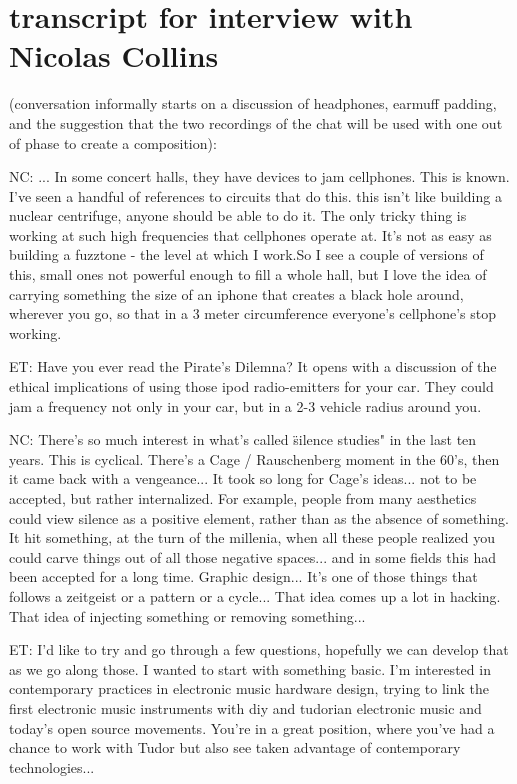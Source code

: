 \section{transcript for interview with Nicolas Collins}

(conversation informally starts on a discussion of headphones, earmuff padding, and the suggestion that the two recordings of the chat will be used with one out of phase to create a composition): 

NC: ... In some concert halls, they have devices to jam cellphones. This is known. I've seen a handful of references to circuits that do this. this isn't like building a nuclear centrifuge, anyone should be able to do it. The only tricky thing is working at such high frequencies that cellphones operate at. It's not as easy as building a fuzztone - the level at which I work.So I see a couple of versions of this, small ones not powerful enough to fill a whole hall, but I love the idea of carrying something the size of an iphone that creates a black hole around, wherever you go, so that in a 3 meter circumference everyone's cellphone's stop working. 

ET: Have you ever read the Pirate's Dilemna? It opens with a discussion of the ethical implications of using those ipod radio-emitters for your car. They could jam a frequency not only in your car, but in a 2-3 vehicle radius around you.

NC: There's so much interest in what's called \"silence studies" in the last ten years. This is cyclical. There's a Cage / Rauschenberg moment in the 60's, then it came back with a vengeance... It took so long for Cage's ideas... not to be accepted, but rather internalized. For example, people from many aesthetics could view silence as a positive element, rather than as the absence of something. It hit something, at the turn of the millenia, when all these people realized you could carve things out of all those negative spaces... and in some fields this had been accepted for a long time. Graphic design... It's one of those things that follows a zeitgeist or a pattern or a cycle... That idea comes up a lot in hacking. That idea of injecting something or removing something...

ET: I'd like to try and go through a few questions, hopefully we can develop that as we go along those. I wanted to start with something basic. I'm interested in contemporary practices in electronic music hardware design, trying to link the first electronic music instruments with diy and tudorian electronic music and today's open source movements. You're in a great position, where you've had a chance to work with Tudor but also see taken advantage of contemporary technologies...

